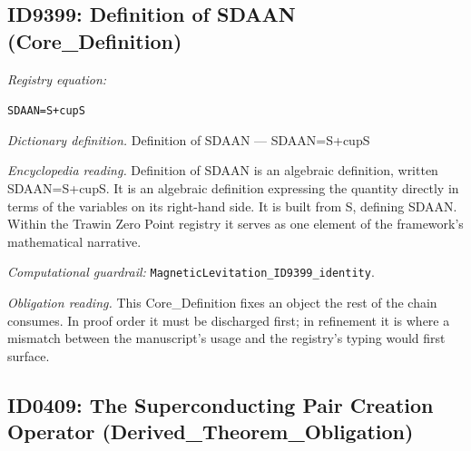\documentclass[11pt]{article}
\theoremstyle{remark}
\begin{document}
\subsection{ID9399: Definition of SDAAN (Core\_Definition)}

\noindent\textit{Registry equation:}\par
{\small\texttt{SDAAN=S+cupS}}\par\medskip
\noindent\textit{Dictionary definition.} Definition of SDAAN --- SDAAN=S+cupS\par\medskip
\noindent\textit{Encyclopedia reading.} Definition of SDAAN is an algebraic definition, written SDAAN=S+cupS. It is an algebraic definition expressing the quantity directly in terms of the variables on its right-hand side. It is built from S, defining SDAAN. Within the Trawin Zero Point registry it serves as one element of the framework's mathematical narrative.
\par\medskip\noindent\textit{Computational guardrail:} \texttt{MagneticLevitation\_ID9399\_identity}.
\par\medskip\noindent\textit{Obligation reading.} This Core\_Definition fixes an object the rest of the chain consumes. In proof order it must be discharged first; in refinement it is where a mismatch between the manuscript's usage and the registry's typing would first surface.

\subsection{ID0409: The Superconducting Pair Creation Operator (Derived\_Theorem\_Obligation)}
\end{document}
